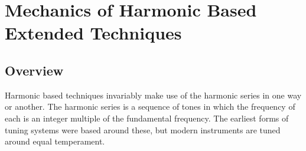 
\chapter[MECHANICS OF HARMONIC BASED EXTENDED TECHNIQUES]{Mechanics of Harmonic Based Extended Techniques}

\section{Overview}
Harmonic based techniques invariably make use of the harmonic series in one way or another. The harmonic series is a sequence of tones in which the frequency of each is an integer multiple of the fundamental frequency. The earliest forms of tuning systems were based around these, but modern instruments are tuned around equal temperament.